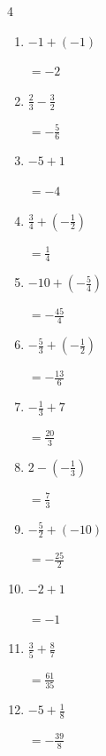 \begin{multicols}{4}
\begin{enumerate}
        $\displaystyle =-\frac{52}{63}$

  \item $\displaystyle -1 + \left(-1\right)$

        $\displaystyle =-2$

  \item $\displaystyle \frac{2}{3} - \frac{3}{2}$

        $\displaystyle =-\frac{5}{6}$

  \item $\displaystyle -5 + 1$

        $\displaystyle =-4$

  \item $\displaystyle \frac{3}{4} + \left(-\frac{1}{2}\right)$

        $\displaystyle =\frac{1}{4}$

  \item $\displaystyle -10 + \left(-\frac{5}{4}\right)$

        $\displaystyle =-\frac{45}{4}$

  \item $\displaystyle -\frac{5}{3} + \left(-\frac{1}{2}\right)$

        $\displaystyle =-\frac{13}{6}$

  \item $\displaystyle -\frac{1}{3} + 7$

        $\displaystyle =\frac{20}{3}$

\columnbreak %

  \item $\displaystyle 2 - \left(-\frac{1}{3}\right)$

        $\displaystyle =\frac{7}{3}$

  \item $\displaystyle -\frac{5}{2} + \left(-10\right)$

        $\displaystyle =-\frac{25}{2}$

  \item $\displaystyle -2 + 1$

        $\displaystyle =-1$

  \item $\displaystyle \frac{3}{5} + \frac{8}{7}$

        $\displaystyle =\frac{61}{35}$

  \item $\displaystyle -5 + \frac{1}{8}$

        $\displaystyle =-\frac{39}{8}$


\end{enumerate}
\end{multicols}
